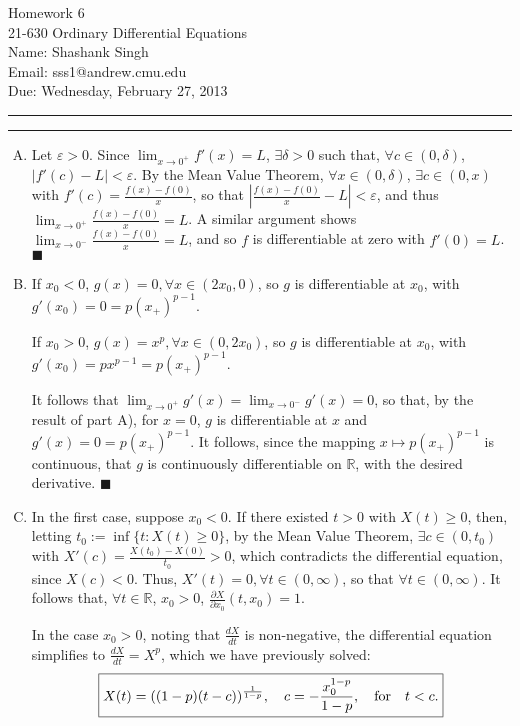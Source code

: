 \documentclass[11pt]{article}
\makeatletter
\newcounter{questionCounter}
\newcounter{partCounter}[questionCounter]
\newenvironment{question}[2][\arabic{questionCounter}]{%
    \setcounter{partCounter}{0}%
    \vspace{.25in} \hrule \vspace{0.5em}%
        \noindent{\bf #2}%
    \vspace{0.8em} \hrule \vspace{.10in}%
    \addtocounter{questionCounter}{1}%
}{}
\newcommand{\myname}{Shashank Singh}
\newcommand{\myandrew}{sss1@andrew.cmu.edu}
\newcommand{\myclass}{21-630 Ordinary Differential Equations}
\newcommand{\myhwnum}{6}
\newcommand{\duedate}{Wednesday, February 27, 2013}
\renewcommand{\qed}{\quad $\blacksquare$}
\newcommand{\R}{\mathbb{R}} %
\newcommand{\e}{\varepsilon} %
\makeatother
\begin{document}
\thispagestyle{plain}

{\Large Homework \myhwnum} \\
\myclass \\
Name: \myname \\
Email: \myandrew \\
Due: \duedate

\begin{question}{Problem 1}
\begin{enumerate}[A)]
\item Let $\e > 0$. Since $\lim_{x \rightarrow 0^+}f'(x) = L$,
$\exists \delta > 0$ such that, $\forall c \in (0,\delta)$, $|f'(c) - L| < \e$.
By the Mean Value Theorem, $\forall x \in (0,\delta)$, $\exists c \in (0,x)$
with $f'(c) = \frac{f(x) - f(0)}{x}$, so that
$\left| \frac{f(x) - f(0)}{x} - L \right| < \e$,
and thus $\lim_{x \rightarrow 0^+}\frac{f(x) - f(0)}{x} = L$. A similar
argument shows $\lim_{x \rightarrow 0^-}\frac{f(x) - f(0)}{x} = L$, and so
$f$ is differentiable at zero with $f'(0) = L$. \qed

\item If $x_0 < 0$, $g(x) = 0, \forall x \in (2x_0,0)$, so $g$ is
differentiable at $x_0$, with $g'(x_0) = 0 = p(x_+)^{p - 1}$.

If $x_0 > 0$, $g(x) = x^p, \forall x \in (0,2x_0)$, so $g$ is differentiable at
$x_0$, with $g'(x_0) = px^{p - 1} = p(x_+)^{p - 1}$.

It follows that $\lim_{x \rightarrow 0^+} g'(x)
 = \lim_{x \rightarrow 0^-} g'(x) = 0$, so that, by the result of part A), for
$x = 0$, $g$ is differentiable at $x$ and $g'(x) = 0 = p(x_+)^{p - 1}$. It
follows, since the mapping $x \mapsto p(x_+)^{p - 1}$ is continuous, that $g$
is continuously differentiable on $\R$, with the desired derivative. \qed

\item In the first case, suppose $x_0 < 0$. If there existed $t > 0$ with
$X(t) \geq 0$, then, letting $t_0 := \inf\{t : X(t) \geq 0\}$, by the Mean
Value Theorem, $\exists c \in (0,t_0)$ with $X'(c) = \frac{X(t_0) -
X(0)}{t_0} > 0$, which contradicts the differential equation, since $X(c) < 0$.
Thus, $X'(t) = 0, \forall t \in (0,\infty)$, so that 
$\forall t \in (0,\infty)$. It follows that, $\forall t \in \R$, $x_0 > 0$,
$\frac{\partial X}{\partial x_0}(t,x_0) = 1$.

In the case $x_0 > 0$, noting that $\frac{dX}{dt}$ is non-negative, the
differential equation simplifies to $\frac{dX}{dt} = X^p$, which we have
previously solved:
\[\mbox{\fbox{$\displaystyle X(t) = ((1 - p)(t - c))^{\frac{1}{1 - p}}, \quad
 c = -\frac{x_0^{1 - p}}{1 - p}, \quad \mbox{for} \quad t < c$.}}\]


\end{enumerate}
\end{question}
\end{document}

